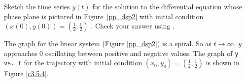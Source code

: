 \documentclass{ximera}
\begin{document}
\begin{computerExercise} \label{c3.5.4}
Sketch the time series $y(t)$ for the solution to the
differential equation whose phase plane is pictured in
Figure~\ref{pp_dsp2} with initial condition
$(x(0),y(0))=\left(\frac{1}{2},\frac{1}{2}\right)$ .  Check your answer
using {\pplane}.

\begin{solution}

The {\pplane} graph for the linear system (Figure \ref{pp_dsp2}) is
a spiral.  So as $t \rightarrow \infty$, $y$ approaches $0$ oscillating
between positive and negative values.  The graph of {\tt y vs.\ t} for the
trajectory with initial condition $(x_0,y_0) = \left(\frac{1}{2},
\frac{1}{2}\right)$ is shown in Figure \ref{c3.5.4}.

\begin{figure}[htb]
                       \centerline{%
                       }
\end{figure}

\end{solution}
\end{computerExercise}
\end{document}
